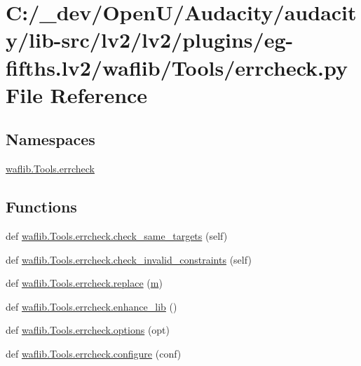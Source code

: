\hypertarget{lv2_2plugins_2eg-fifths_8lv2_2waflib_2_tools_2errcheck_8py}{}\section{C\+:/\+\_\+dev/\+Open\+U/\+Audacity/audacity/lib-\/src/lv2/lv2/plugins/eg-\/fifths.lv2/waflib/\+Tools/errcheck.py File Reference}
\label{lv2_2plugins_2eg-fifths_8lv2_2waflib_2_tools_2errcheck_8py}
\subsection*{Namespaces}
\begin{DoxyCompactItemize}
\item 
 \hyperlink{namespacewaflib_1_1_tools_1_1errcheck}{waflib.\+Tools.\+errcheck}
\end{DoxyCompactItemize}
\subsection*{Functions}
\begin{DoxyCompactItemize}
\item 
def \hyperlink{namespacewaflib_1_1_tools_1_1errcheck_abfda92de66a72045068f150db1f86e29}{waflib.\+Tools.\+errcheck.\+check\+\_\+same\+\_\+targets} (self)
\item 
def \hyperlink{namespacewaflib_1_1_tools_1_1errcheck_a77b03ce1d3ecfd9295275ce9685d1c80}{waflib.\+Tools.\+errcheck.\+check\+\_\+invalid\+\_\+constraints} (self)
\item 
def \hyperlink{namespacewaflib_1_1_tools_1_1errcheck_a3c373d095646ee41f81dd43ade9e0b63}{waflib.\+Tools.\+errcheck.\+replace} (\hyperlink{layer3_8c_a4b8bfe70f28d6faddcb10d6ecf8c1989}{m})
\item 
def \hyperlink{namespacewaflib_1_1_tools_1_1errcheck_a7752dc841ad9140b7f0dc591120a6a0d}{waflib.\+Tools.\+errcheck.\+enhance\+\_\+lib} ()
\item 
def \hyperlink{namespacewaflib_1_1_tools_1_1errcheck_ac059af9fc4bbe227373b3081aef0221d}{waflib.\+Tools.\+errcheck.\+options} (opt)
\item 
def \hyperlink{namespacewaflib_1_1_tools_1_1errcheck_a8456470882cfc53f245e965934344c2f}{waflib.\+Tools.\+errcheck.\+configure} (conf)
\end{DoxyCompactItemize}
